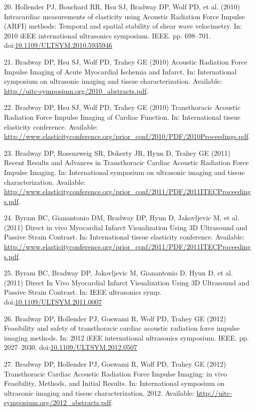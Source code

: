 \documentclass[]{article}
\begin{document}
20. Hollender PJ, Bouchard RR, Hsu SJ, Bradway DP, Wolf PD, et al.
(2010) Intracardiac measurements of elasticity using Acoustic Radiation
Force Impulse (ARFI) methods: Temporal and spatial stability of shear
wave velocimetry. In: 2010 iEEE international ultrasonics symposium.
IEEE. pp. 698--701.
doi:\href{http://dx.doi.org/10.1109/ULTSYM.2010.5935946}{10.1109/ULTSYM.2010.5935946}

21. Bradway DP, Hsu SJ, Wolf PD, Trahey GE (2010) Acoustic Radiation
Force Impulse Imaging of Acute Myocardial Ischemia and Infarct. In:
International symposium on ultrasonic imaging and tissue
characterization. Available:
\url{http://uitc-symposium.org/2010_abstracts.pdf}.

22. Bradway DP, Hsu SJ, Wolf PD, Trahey GE (2010) Transthoracic Acoustic
Radiation Force Impulse Imaging of Cardiac Function. In: International
tissue elasticity conference. Available:
\url{http://www.elasticityconference.org/prior_conf/2010/PDF/2010Proceedings.pdf}.

23. Bradway DP, Rosenzweig SR, Doherty JR, Hyun D, Trahey GE (2011)
Recent Results and Advances in Transthoracic Cardiac Acoustic Radiation
Force Impulse Imaging. In: International symposium on ultrasonic imaging
and tissue characterization. Available:
\url{http://www.elasticityconference.org/prior_conf/2011/PDF/2011ITECProceedings.pdf}.

24. Byram BC, Gianantonio DM, Bradway DP, Hyun D, Jakovljevic M, et al.
(2011) Direct in vivo Myocardial Infarct Visualization Using 3D
Ultrasound and Passive Strain Contrast. In: International tissue
elasticity conference. Available:
\url{http://www.elasticityconference.org/prior_conf/2011/PDF/2011ITECProceedings.pdf}.

25. Byram BC, Bradway DP, Jakovljevic M, Gianantonio D, Hyun D, et al.
(2011) Direct In Vivo Myocardial Infarct Visualization Using 3D
Ultrasound and Passive Strain Contrast. In: IEEE ultrasonics symp.
doi:\href{http://dx.doi.org/10.1109/ULTSYM.2011.0007}{10.1109/ULTSYM.2011.0007}

26. Bradway DP, Hollender PJ, Goswami R, Wolf PD, Trahey GE (2012)
Feasibility and safety of transthoracic cardiac acoustic radiation force
impulse imaging methods. In: 2012 iEEE international ultrasonics
symposium. IEEE. pp. 2027--2030.
doi:\href{http://dx.doi.org/10.1109/ULTSYM.2012.0507}{10.1109/ULTSYM.2012.0507}

27. Bradway DP, Hollender PJ, Goswami R, Wolf PD, Trahey GE (2012)
Transthoracic Cardiac Acoustic Radiation Force Impulse Imaging: in vivo
Feasibility, Methods, and Initial Results. In: International symposium
on ultrasonic imaging and tissue characterization, 2012. Available:
\url{http://uitc-symposium.org/2012_abstracts.pdf}.
\end{document}

